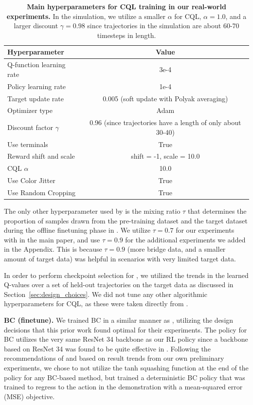 \documentclass[../thesis.tex]{subfiles}
\begin{document}
\begin{table}[h]
\centering
\begin{tabular}{l|c}
\toprule
\textbf{Hyperparameter} & \textbf{Value}\\  \midrule
Q-function learning rate & 3e-4 \\
Policy learning rate & 1e-4 \\
Target update rate & 0.005 (soft update with Polyak averaging) \\
Optimizer type & Adam \\
Discount factor $\gamma$ & 0.96 (since trajectories have a length of only about 30-40) \\
Use terminals & True \\
Reward shift and scale & shift = -1, scale = 10.0 \\
CQL $\alpha$ & 10.0 \\
Use Color Jitter & True \\
Use Random Cropping & True \\
\bottomrule
\end{tabular}
\vspace{0.07cm}
\caption{\footnotesize{\textbf{Main hyperparameters for CQL training in our real-world experiments.} In the simulation, we utilize a smaller $\alpha$ for CQL, $\alpha=1.0$, and a larger discount $\gamma = 0.98$ since trajectories in the simulation are about 60-70 timesteps in length. }}
\label{tab:hparams_cql}
\end{table}

The only other hyperparameter used by \ptrmethodname is the mixing ratio $\tau$ that determines the proportion of samples drawn from the pre-training dataset and the target dataset during the offline finetuning phase in \ptrmethodname. We utilize $\tau = 0.7$ for our experiments with \ptrmethodname in the main paper, and use $\tau = 0.9$ for the additional experiments we added in the Appendix. This is because $\tau=0.9$ (more bridge data, and a smaller amount of target data) was helpful in scenarios with very limited target data.  

In order to perform checkpoint selection for \ptrmethodname, we utilized the trends in the learned Q-values over a set of held-out trajectories on the target data as discussed in Section~\ref{sec:design_choices}. We did not tune any other algorithmic hyperparameters for CQL, as these were taken directly from \citep{singh2020cog}.  

\textbf{BC (finetune).}
We trained BC in a similar manner as \citet{ebert2021bridge}, utilizing the design decisions that this prior work found optimal for their experiments. The policy for BC utilizes the very same ResNet 34 backbone as our RL policy since a backbone based on ResNet 34 was found to be quite effective in \citet{ebert2021bridge}. Following the recommendations of \citet{ebert2021bridge} and based on result trends from our own preliminary experiments, we chose to not utilize the tanh squashing function at the end of the policy for any BC-based method, but trained a deterministic BC policy that was trained to regress to the action in the demonstration with a mean-squared error (MSE) objective. 
\end{document}
